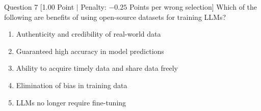 \documentclass[11pt,a4paper]{article}
\begin{document}
\begin{questionbox}{Question 7 \hfill [1.00 Point $\vert$ Penalty: $-0.25$ Points per wrong selection]}
Which of the following are benefits of using open-source datasets for training LLMs?
\begin{enumerate}[label=\alph*.,leftmargin=2em]
    \item Authenticity and credibility of real-world data
    \item Guaranteed high accuracy in model predictions
    \item Ability to acquire timely data and share data freely
    \item Elimination of bias in training data
    \item LLMs no longer require fine-tuning
\end{enumerate}
\end{questionbox}
\end{document}
